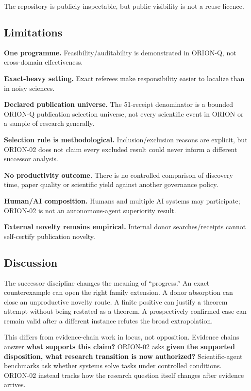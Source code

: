 \documentclass[preprint,12pt]{elsarticle}
\begin{document}
The repository is publicly inspectable, but public visibility is not a
reuse licence.

\hypertarget{limitations}{%
\subsection{Limitations}\label{limitations}}

\textbf{One programme.} Feasibility/auditability is demonstrated in
ORION-Q, not cross-domain effectiveness.

\textbf{Exact-heavy setting.} Exact referees make responsibility easier
to localize than in noisy sciences.

\textbf{Declared publication universe.} The 51-receipt denominator is a
bounded ORION-Q publication selection universe, not every scientific
event in ORION or a sample of research generally.

\textbf{Selection rule is methodological.} Inclusion/exclusion reasons
are explicit, but ORION-02 does not claim every excluded result could
never inform a different successor analysis.

\textbf{No productivity outcome.} There is no controlled comparison of
discovery time, paper quality or scientific yield against another
governance policy.

\textbf{Human/AI composition.} Humans and multiple AI systems may
participate; ORION-02 is not an autonomous-agent superiority result.

\textbf{External novelty remains empirical.} Internal donor
searches/receipts cannot self-certify publication novelty.

\hypertarget{discussion}{%
\subsection{Discussion}\label{discussion}}

The successor discipline changes the meaning of ``progress.'' An exact
counterexample can open the right family extension. A donor absorption
can close an unproductive novelty route. A finite positive can justify a
theorem attempt without being restated as a theorem. A prospectively
confirmed case can remain valid after a different instance refutes the
broad extrapolation.

This differs from evidence-chain work in locus, not opposition. Evidence
chains answer \textbf{what supports this claim?} ORION-02 asks
\textbf{given the supported disposition, what research transition is now
authorized?} Scientific-agent benchmarks ask whether systems solve tasks
under controlled conditions. ORION-02 instead tracks how the research
question itself changes after evidence arrives.
\end{document}
